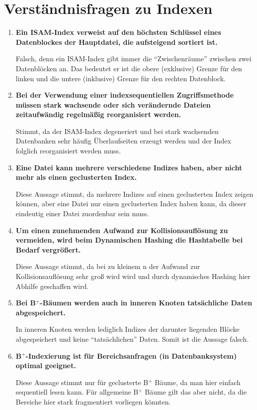 \documentclass{scrartcl}
\begin{document}
\maketitle

\section{Verständnisfragen zu Indexen}
\begin{enumerate}
    \item \textbf{Ein ISAM-Index verweist auf den höchsten Schlüssel eines Datenblockes der Hauptdatei, die aufsteigend sortiert ist.}
    
    Falsch, denn ein ISAM-Index gibt immer die ``Zwischenräume'' zwischen zwei Datenblöcken an. Das bedeutet er ist die obere (exklusive) Grenze für den linken und die untere (inklusive) Grenze für den rechten Datenblock. 
    \item \textbf{Bei der Verwendung einer indexsequentiellen Zugriffsmethode müssen stark wachsende oder sich verändernde Dateien zeitaufwändig regelmäßig reorganisiert werden.}
    
    Stimmt, da der ISAM-Index degeneriert und bei stark wachsenden Datenbanken sehr häufig Überlaufseiten erzeugt werden und der Index folglich reorganisiert werden muss.
    \item \textbf{Eine Datei kann mehrere verschiedene Indizes haben, aber nicht mehr als einen geclusterten Index.}
    
    Diese Aussage stimmt, da mehrere Indizes auf einen geclusterten Index zeigen können, aber eine Datei nur einen geclusterten Index haben kann, da dieser eindeutig einer Datei zuordenbar sein muss.
    \item \textbf{Um einen zunehmenden Aufwand zur Kollisionsauflösung zu vermeiden, wird beim Dynamischen Hashing die Hashtabelle bei Bedarf vergrößert.}
    
    Diese Aussage stimmt, da bei zu kleinem n der Aufwand zur Kollisionsauflösung sehr groß wird wird und durch dynamisches Hashing hier Abhilfe geschaffen wird.
    \item \textbf{Bei B$^+$-Bäumen werden auch in inneren Knoten tatsächliche Daten abgespeichert.}
    
    In inneren Knoten werden lediglich Indizes der darunter liegenden Blöcke abgespeichert und keine ``tatsächlichen'' Daten. Somit ist die Aussage falsch.
    \item \textbf{B$^+$-Indexierung ist für Bereichsanfragen (in Datenbanksystem) optimal geeignet.}
    
    Diese Aussage stimmt nur für geclusterte B$^+$ Bäume, da man hier einfach sequentiell lesen kann. Für allgemeine B$^+$ Bäume gilt das aber nicht, da die Bereiche hier stark fragmentiert vorliegen könnten.
\end{enumerate}
\end{document}
